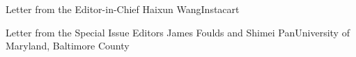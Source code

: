 \documentclass[11pt]{article}
\begin{document}


\begin{bulletin}


%
%

\begin{lettersection}


\begin{letter}{Letter from the Editor-in-Chief}
{Haixun Wang}{Instacart}

\end{letter}
%
\newpage
%
%
\begin{letter}{Letter from the Special Issue Editors} %
{James Foulds and Shimei Pan}{University of Maryland, Baltimore County}


\end{letter}

\end{lettersection}


%


\end{bulletin}
\end{document}
